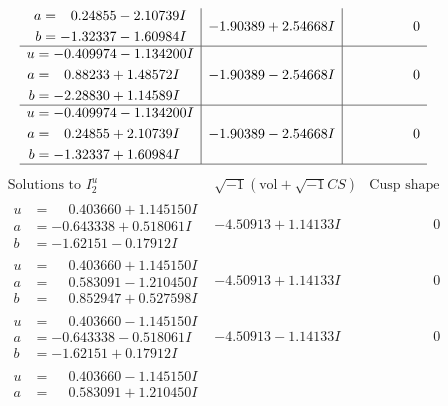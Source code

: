 \documentclass[1p]{elsarticle_modified}
\theoremstyle{definition}
\newcommand{\I}{\sqrt{-1}}
\begin{document}
$$\begin{array}{c|c|c}
\begin{aligned}
a &= \phantom{-}0.24855 - 2.10739 I \\
b &= -1.32337 - 1.60984 I\end{aligned}
 & -1.90389 + 2.54668 I & \phantom{-0.000000 } 0 \\ \hline\begin{aligned}
u &= -0.409974 - 1.134200 I \\
a &= \phantom{-}0.88233 + 1.48572 I \\
b &= -2.28830 + 1.14589 I\end{aligned}
 & -1.90389 - 2.54668 I & \phantom{-0.000000 } 0 \\ \hline\begin{aligned}
u &= -0.409974 - 1.134200 I \\
a &= \phantom{-}0.24855 + 2.10739 I \\
b &= -1.32337 + 1.60984 I\end{aligned}
 & -1.90389 - 2.54668 I & \phantom{-0.000000 } 0\\
 \hline 
 \end{array}$$\newpage$$\begin{array}{c|c|c}  
\text{Solutions to }I^u_{2}& \I (\text{vol} + \sqrt{-1}CS) & \text{Cusp shape}\\
 \hline 
\begin{aligned}
u &= \phantom{-}0.403660 + 1.145150 I \\
a &= -0.643338 + 0.518061 I \\
b &= -1.62151 - 0.17912 I\end{aligned}
 & -4.50913 + 1.14133 I & \phantom{-0.000000 } 0 \\ \hline\begin{aligned}
u &= \phantom{-}0.403660 + 1.145150 I \\
a &= \phantom{-}0.583091 - 1.210450 I \\
b &= \phantom{-}0.852947 + 0.527598 I\end{aligned}
 & -4.50913 + 1.14133 I & \phantom{-0.000000 } 0 \\ \hline\begin{aligned}
u &= \phantom{-}0.403660 - 1.145150 I \\
a &= -0.643338 - 0.518061 I \\
b &= -1.62151 + 0.17912 I\end{aligned}
 & -4.50913 - 1.14133 I & \phantom{-0.000000 } 0 \\ \hline\begin{aligned}
u &= \phantom{-}0.403660 - 1.145150 I \\
a &= \phantom{-}0.583091 + 1.210450 I \\

\end{aligned}
\end{array}$$
\end{document}
